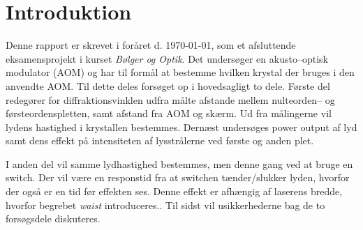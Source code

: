\documentclass[main]{subfiles}
\begin{document}
\section{Introduktion}
Denne rapport er skrevet i foråret d. \today, som et afsluttende eksamensprojekt i kurset \emph{Bølger og Optik}. Det undersøger en akusto--optisk modulator (AOM) og har til formål at bestemme hvilken krystal der bruges i den anvendte AOM. Til dette deles forsøget op i hovedsagligt to dele. Første del redegører for diffraktionsvinklen udfra målte afstande mellem nulteorden-- og førsteordenspletten, samt afstand fra AOM og skærm. Ud fra målingerne vil lydens hastighed i krystallen bestemmes.
Dernæst undersøges power output af lyd samt dens effekt på intensiteten af lysstrålerne ved første og anden plet.

I anden del vil samme lydhastighed bestemmes, men denne gang ved at bruge en switch. Der vil være en responstid fra at switchen tænder/slukker lyden, hvorfor der også er en tid før effekten ses. Denne effekt er afhængig af laserens bredde, hvorfor begrebet \emph{waist} introduceres..  
Til sidst vil usikkerhederne bag de to forsøgsdele diskuteres.
\end{document}
